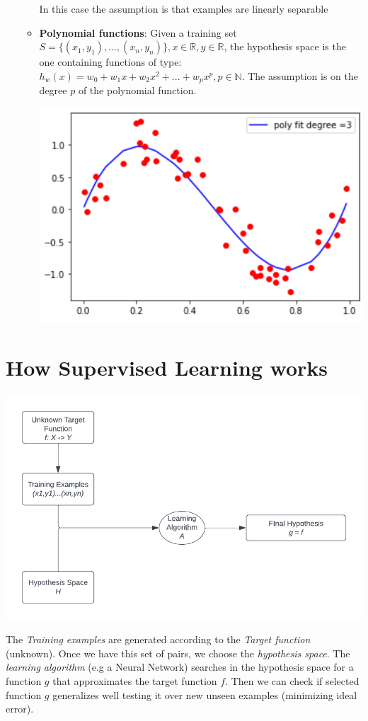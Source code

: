 \begin{itemize}
\begin{itemize}
    In this case the assumption is that examples are linearly separable
    
    \item \textbf{Polynomial functions}:
    Given a training set $S = \{(x_{1},y_{1}),...,(x_{n}, y_{n})\}, x\in \mathbb{R}, y\in \mathbb{R}$, the hypothesis space is the one containing functions of type: $h_{w}(x) = w_{0} + w_{1}x + w_{2}x^{2} + ... + w_{p}x^{p}, p\in \mathbb{N}$. The assumption is on the degree $p$ of the polynomial function.
    \begin{center}
        \includegraphics{images/Poly reg.png}
    \end{center}
\end{itemize}
\end{itemize}
\section{How Supervised Learning works}
\begin{center}
    \includegraphics{images/Supervised Learning Diagram.png}
\end{center}
The \textit{Training examples} are generated according to the \textit{Target function} (unknown). Once we have this set of pairs, we choose the \textit{hypothesis space}. The \textit{learning algorithm} (e.g a Neural Network) searches in the hypothesis space for a function $g$ that approximates the target function $f$. Then we can check if selected function $g$ generalizes well testing it over new unseen examples (minimizing ideal error).
